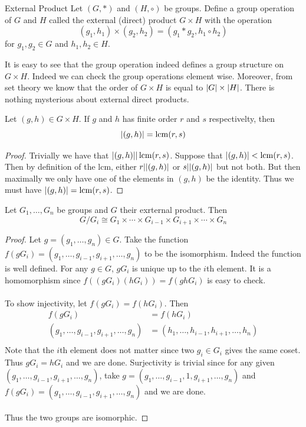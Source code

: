 \documentclass[a4paper]{article}
\begin{document}
\begin{defn}{External Product}{} Let $(G,\ast)$ and $(H,\circ)$ be groups. Define a group operation of $G$ and $H$ called the external (direct) product $G\times H$ with the operation $$(g_1,h_1)\times(g_2,h_2)=(g_1\ast g_2,h_1\circ h_2)$$ for $g_1,g_2\in G$ and $h_1,h_2\in H$. 
\end{defn}

It is easy to see that the group operation indeed defines a group structure on $G\times H$. Indeed we can check the group operations element wise. Moreover, from set theory we know that the order of $G\times H$ is equal to $\abs{G}\times\abs{H}$. There is nothing mysterious about external direct products. 

\begin{thm}{}{} Let $(g,h)\in G\times H$. If $g$ and $h$ has finite order $r$ and $s$ respectivelty, then $$\abs{(g,h)}=\operatorname{lcm}(r,s)$$ \tcbline
\begin{proof}
Trivially we have that $\abs{(g,h)}|\operatorname{lcm}(r,s)$. Suppose that $\abs{(g,h)}<\operatorname{lcm}(r,s)$. Then by definition of the lcm, either $r|\abs{(g,h)}$ or $s|\abs{(g,h)}$ but not both. But then maximally we only have one of the elements in $(g,h)$ be the identity. Thus we must have $\abs{(g,h)}=\operatorname{lcm}(r,s)$. 
\end{proof}
\end{thm}

\begin{prp}{}{} Let $G_1,\dots, G_n$ be groups and $G$ their exrternal product. Then $$G/G_i\cong G_1\times\cdots \times G_{i-1}\times G_{i+1}\times\cdots\times G_n$$\tcbline
\begin{proof}
Let $g=(g_1,\dots,g_n)\in G$. Take the function $f(gG_i)=(g_1,\dots,g_{i-1},g_{i+1},\dots,g_n)$ to be the isomorphism. Indeed the function is well defined. For any $g\in G$, $gG_i$ is unique up to the $i$th element. It is a homomorphism since $f((gG_i)(hG_i))=f(ghG_i)$ is easy to check. \\~\\
To show injectivity, let $f(gG_i)=f(hG_i)$. Then
\begin{align*}
f(gG_i)&=f(hG_i)\\
(g_1,\dots,g_{i-1},g_{i+1},\dots,g_n)&=(h_1,\dots,h_{i-1},h_{i+1},\dots,h_n)\\
\end{align*}
Note that the $i$th element does not matter since two $g_i\in G_i$ gives the same coset. Thus $gG_i=hG_i$ and we are done. Surjectivity is trivial since for any given $(g_1,\dots,g_{i-1},g_{i+1},\dots,g_n)$, take $g=(g_1,\dots,g_{i-1},1,g_{i+1},\dots,g_n)$ and $f(gG_i)=(g_1,\dots,g_{i-1},g_{i+1},\dots,g_n)$ and we are done. \\~\\
Thus the two groups are isomorphic. 
\end{proof}
\end{prp}
\end{document}
